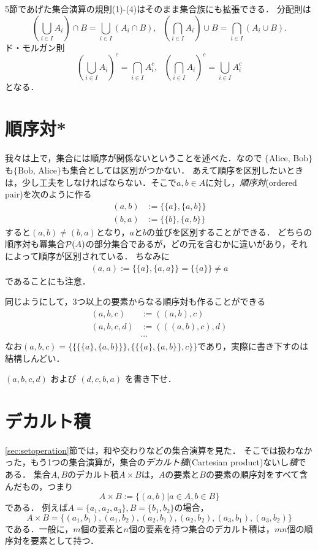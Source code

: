 \documentclass[11pt,a4paper]{jsarticle}
\begin{document}
5節であげた集合演算の規則(1)-(4)はそのまま集合族にも拡張できる．
分配則は
\[
 \left( \bigcup_{i \in I} A_i \right) \cap B = \bigcup_{i \in I} \left( A_i  \cap B \right) , \ \ \ 
 \left( \bigcap_{i \in I} A_i \right) \cup B = \bigcap_{i \in I} \left( A_i  \cup B \right). 
\]
ド・モルガン則
\[
 \left( \bigcup_{i \in I} A_i \right)^c = \bigcap_{i \in I} A_i^c, \ \ \ 
 \left( \bigcap_{i \in I} A_i \right)^c = \bigcup_{i \in I} A_i^c
\]
となる．





\section{順序対*}
我々は上で，集合には順序が関係ないということを述べた．なので $\{\text{Alice, Bob}\}$も$\{\text{Bob, Alice}\}$も集合としては区別がつかない．
あえて順序を区別したいときは，少し工夫をしなければならない．そこで$a, b \in A$に対し，\emph{順序対}(ordered pair)を次のように作る
\begin{align*}
 (a, b) &:= \{ \{a\}, \{a, b\} \} \\
 (b, a) &:= \{ \{b\}, \{a, b\} \} 
\end{align*}
すると$(a,b) \neq (b,a)$となり，$a$と$b$の並びを区別することができる．
どちらの順序対も冪集合$\mathcal{P}(A)$の部分集合であるが，どの元を含むかに違いがあり，それによって順序が区別されている．
ちなみに
\begin{align*}
 (a, a) := \{ \{a\}, \{a, a\} \} = \{ \{a\} \} \neq a 
\end{align*}
であることにも注意．

同じようにして，3つ以上の要素からなる順序対も作ることができる
\begin{align*}
 (a, b, c) &:= ((a,b), c) \\
 (a, b, c, d) &:= (((a,b), c), d) \\
&\cdots
\end{align*}
なお$ (a, b, c) = \{\{\{\{a\}, \{a,b\}\}\}, \{\{\{a\}, \{a,b\}\}, c\}\}$であり，実際に書き下すのは結構しんどい．

\begin{exercise}
$(a,b,c,d)$ および $(d,c,b,a)$ を書き下せ．
\end{exercise} 

 
\section{デカルト積}
\ref{sec:setoperation}節では，和や交わりなどの集合演算を見た．
そこでは扱わなかった，もう1つの集合演算が，集合の\emph{デカルト積}(Cartesian product)ないし\emph{積}である．
集合$A, B$のデカルト積$A \times B$は，$A$の要素と$B$の要素の順序対をすべて含んだもの，つまり
\[
 A \times B := \{ (a, b) | a \in A, b \in B\}
\]
である．
例えば$A = \{a_1, a_2, a_3\}, B = \{b_1, b_2\}$の場合，
\[
A \times B = \{(a_1, b_1), (a_1, b_2), (a_2, b_1), (a_2, b_2), (a_3, b_1), (a_3, b_2)\}
\]
である．一般に，$m$個の要素と$n$個の要素を持つ集合のデカルト積は，$mn$個の順序対を要素として持つ．
\end{document}
